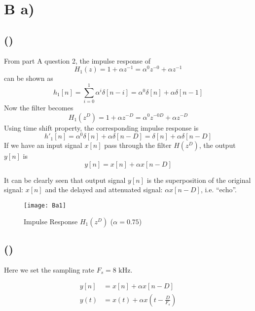 \documentclass{article}
\newenvironment{homeworkProblem}[1]{
	\section*{#1}
	}{
}
\newenvironment{homeworkSection}[1]{
	\subsection*{#1}
	}{
}
\begin{document}
\newpage


\begin{homeworkProblem}{B a)}

\begin{homeworkSection}{()}

From part A question 2, the impulse response of 
\begin{equation}
H_1(z)=1+\alpha z^{-1}=\alpha^0 z^{-0}+\alpha z^{-1}
\end{equation}
can be shown as  
\begin{equation}
h_1[n]=\sum_{i=0}^{1}\alpha^i\delta[n-i]=\alpha^0\delta[n]+\alpha\delta[n-1]
\end{equation}
Now the filter becomes
\begin{equation}
H_1(z^D) = 1 + \alpha z^{-D}=\alpha^0z^{-0D}+\alpha z^{-D}
\end{equation}
Using time shift property, the corresponding impulse response is 
\begin{equation}
h'_1[n]=\alpha^0\delta[n]+\alpha\delta[n-D]=\delta[n]+\alpha\delta[n-D]
\end{equation}
If we have an input signal $x[n]$ pass through the filter $H(z^D)$, the output $y[n]$ is 
\begin{equation}
y[n]=x[n]+\alpha x[n-D]
\end{equation} 

It can be clearly seen that output signal $y[n]$ is the superposition of the original signal: $x[n]$ and the delayed and attenuated signal: $\alpha x[n-D]$, i.e. ``echo''.

\begin{figure}[H]
\centering
\texttt{[image: Ba1]}
\caption{Impulse Response $H_1(z^D)$ ($\alpha=0.75$)}
\label{Ba2}
\end{figure}

\end{homeworkSection}

\begin{homeworkSection}{()}

Here we set the sampling rate $F_s=8\text{ kHz}$.

\begin{align*}
y[n] &= x[n] + \alpha x[n-D]\\
y(t) &= x(t) + \alpha x(t-\frac{D}{F_s})
\end{align*}


\end{homeworkSection}
\end{homeworkProblem}
\end{document}
